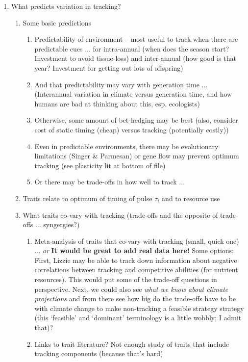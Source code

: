 \documentclass[11pt,letterpaper]{article}
\begin{document}
\begin{enumerate}
\begin{enumerate}
\begin{enumerate}
\end{enumerate}
\end{enumerate}
\item What predicts variation in tracking?
\begin{enumerate}
\item Some basic predictions
\begin{enumerate}
\item Predictability of environment -- most useful to track when there are predictable cues ... for intra-annual (when does the season start? Investment to avoid tissue-loss) and inter-annual (how good is that year? Investment for getting out lots of offspring) 
\item And that predictability may vary with generation time ... (Interannual variation in climate versus generation time, and how humans are bad at thinking about this, esp. ecologists) %
\item Otherwise, some amount of bet-hedging may be best (also, consider cost of static timing (cheap) versus tracking (potentially costly))
\item Even in predictable environments, there may be evolutionary limitations (Singer \& Parmesan) or gene flow may prevent optimum tracking (see plasticity lit at bottom of file)
\item Or there may be trade-offs in how well to track ... 
\end{enumerate}
\item Traits relate to optimum of timing of pulse $\tau_{i}$  and to resource use 
\item What traits co-vary with tracking (trade-offs and the opposite of trade-offs ... syngergies?)
\begin{enumerate}
\item Meta-analysis of traits that co-vary with tracking (small, quick one) ... \emph{or} {\bf It would be great to add real data here!} Some options: First, Lizzie may be able to track down information about negative correlations between tracking and competitive abilities (for nutrient resources). This would put some of the trade-off questions in perspective. Next, we could also see  \emph{what we know about climate projections} and from there see how big do the trade-offs have to be with climate change to make non-tracking a feasible strategy strategy (this `feasible' and `dominant' terminology is a little wobbly; I admit that)? %
\item Links to trait literature? Not enough study of traits that include tracking components (because that's hard)

\end{enumerate}
\end{enumerate}
\end{enumerate}
\end{document}
